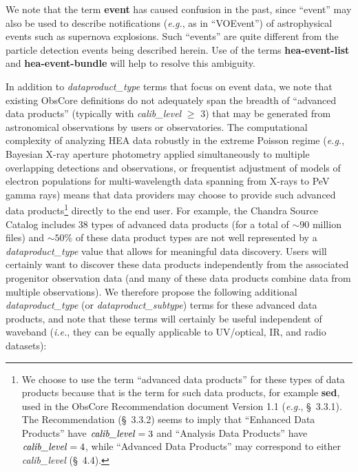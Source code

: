 \documentclass[11pt,a4paper]{ivoa}
\begin{document}
We note that the term {\bf event} has caused confusion in the past, since ``event'' may also be used to describe notifications ({\em e.g.\/}, as in ``VOEvent'') of astrophysical events such as supernova explosions.  Such ``events'' are quite different from the particle detection events being described herein.  Use of the terms {\bf hea-event-list} and {\bf hea-event-bundle}  will help to resolve this ambiguity.

In addition to {\em dataproduct\_type\/} terms that focus on event data, we note that existing ObsCore definitions do not adequately span the breadth of ``advanced data products'' (typically with {\em calib\_level\/} $\ge$ 3) that may be generated from astronomical observations by users or observatories. The computational complexity of analyzing \gls{HEA} data robustly in the extreme Poisson regime ({\em e.g.\/}, Bayesian X-ray aperture photometry applied simultaneously to multiple overlapping detections and observations, or frequentist adjustment of models of electron populations for multi-wavelength data spanning from X-rays to PeV gamma rays) means that data providers may choose to provide such advanced data products\footnote{We choose to use the term ``advanced data products'' for these types of data products because that is the term for such data products, for example {\bf sed}, used in the ObsCore Recommendation document Version 1.1 ({\em e.g.\/}, \S~3.3.1).  The Recommendation (\S~3.3.2) seems to imply that ``Enhanced Data Products'' have $\hbox{\em calib\_level\/} = 3$ and ``Analysis Data Products'' have $\hbox{\em calib\_level\/} = 4$, while ``Advanced Data Products'' may correspond to either {\em calib\_level\/} (\S~4.4).} directly to the end user. For example, the Chandra Source Catalog includes 38 types of advanced data products (for a total of $\sim\!90$ million files) and $\sim\!50$\% of these data product types are not well represented by a  {\em dataproduct\_type\/} value that allows for meaningful data discovery. Users will certainly want to discover these data products independently from the associated progenitor observation data (and many of these data products combine data from multiple observations). We therefore propose the following additional {\em dataproduct\_type\/} (or {\em dataproduct\_subtype\/}) terms for these advanced data products, and note that these terms will certainly be useful independent of waveband ({\em i.e.\/}, they can be equally applicable to UV/optical, IR, and radio datasets):
\end{document}
